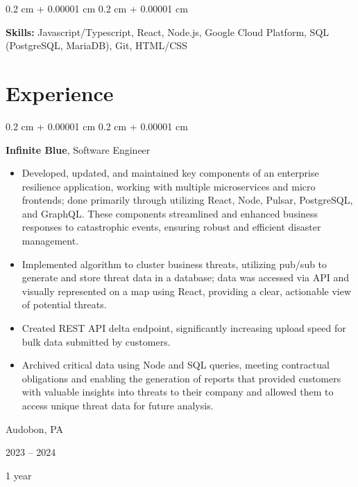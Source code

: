 \documentclass[10pt, letterpaper]{article}
\newenvironment{highlights}{
    \begin{itemize}[
        topsep=0.10 cm,
        parsep=0.10 cm,
        partopsep=0pt,
        itemsep=0pt,
        leftmargin=0.4 cm + 10pt
    ]
}{
    \end{itemize}
} %
\newenvironment{onecolentry}{
    \begin{adjustwidth}{
        0.2 cm + 0.00001 cm
    }{
        0.2 cm + 0.00001 cm
    }
}{
    \end{adjustwidth}
} %
\newenvironment{twocolentry}[2][]{
    \onecolentry
    \def\secondColumn{#2}
    \setcolumnwidth{\fill, 4.5 cm}
    \begin{paracol}{2}
}{
    \switchcolumn \raggedleft \secondColumn
    \end{paracol}
    \endonecolentry
} %
\begin{document}
        
        \begin{onecolentry}
            \textbf{Skills:} Javascript/Typescript, React, Node.js, Google Cloud Platform, SQL (PostgreSQL, MariaDB), Git, HTML/CSS
        \end{onecolentry}


    
    \section{Experience}



        
        \begin{twocolentry}{
            Audobon, PA

        2023 – 2024

        1 year
        }
            \textbf{Infinite Blue}, Software Engineer
            \begin{highlights}
                \item Developed, updated, and maintained key components of an enterprise resilience application, working with multiple microservices and micro frontends; done primarily through utilizing React, Node, Pulsar, PostgreSQL, and GraphQL. These components streamlined and enhanced business responses to catastrophic events, ensuring robust and efficient disaster management.
                \item Implemented algorithm to cluster business threats, utilizing pub/sub to generate and store threat data in a database;  data was accessed via API and visually represented on a map using React, providing a clear, actionable view of potential threats.
                \item Created REST API delta endpoint, significantly increasing upload speed for bulk data submitted by customers.
                \item Archived critical data using Node and SQL queries, meeting contractual obligations and enabling the generation of reports that provided customers with valuable insights into threats to their company and allowed them to access unique threat data for future analysis.
            \end{highlights}
        \end{twocolentry}


        \vspace{0.2 cm}
\end{document}
